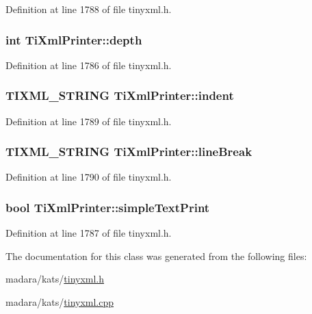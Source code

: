 Definition at line 1788 of file tinyxml.h.

\hypertarget{classTiXmlPrinter_a7e11330449daea912320c22f84387df7}{
\subsubsection[{depth}]{\setlength{\rightskip}{0pt plus 5cm}int {\bf TiXmlPrinter::depth}}}
\label{d4/d3c/classTiXmlPrinter_a7e11330449daea912320c22f84387df7}


Definition at line 1786 of file tinyxml.h.

\hypertarget{classTiXmlPrinter_a672fda389bb3f5a2ae8ead867f9a2536}{
\subsubsection[{indent}]{\setlength{\rightskip}{0pt plus 5cm}TIXML\_\-STRING {\bf TiXmlPrinter::indent}}}
\label{d4/d3c/classTiXmlPrinter_a672fda389bb3f5a2ae8ead867f9a2536}


Definition at line 1789 of file tinyxml.h.

\hypertarget{classTiXmlPrinter_a25e8120bcfda10cc06a11b2dedcef7fe}{
\subsubsection[{lineBreak}]{\setlength{\rightskip}{0pt plus 5cm}TIXML\_\-STRING {\bf TiXmlPrinter::lineBreak}}}
\label{d4/d3c/classTiXmlPrinter_a25e8120bcfda10cc06a11b2dedcef7fe}


Definition at line 1790 of file tinyxml.h.

\hypertarget{classTiXmlPrinter_a2dceede5ae9bb8948f1ecaabb24ab2fb}{
\subsubsection[{simpleTextPrint}]{\setlength{\rightskip}{0pt plus 5cm}bool {\bf TiXmlPrinter::simpleTextPrint}}}
\label{d4/d3c/classTiXmlPrinter_a2dceede5ae9bb8948f1ecaabb24ab2fb}


Definition at line 1787 of file tinyxml.h.



The documentation for this class was generated from the following files:\begin{DoxyCompactItemize}
\item 
madara/kats/\hyperlink{tinyxml_8h}{tinyxml.h}\item 
madara/kats/\hyperlink{tinyxml_8cpp}{tinyxml.cpp}\end{DoxyCompactItemize}

